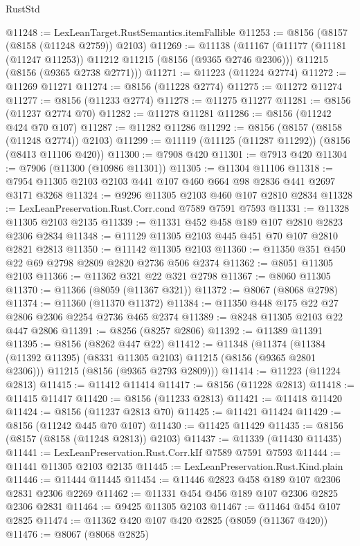 \begin{lexlean}{RustStd}
\begin{coremodule}
@11248 := LexLeanTarget.RustSemantics.itemFallible
@11253 := @8156 (@8157 (@8158 (@11248 @2759)) @2103)
@11269 := @11138
    (@11167
      (@11177 (@11181 (@11247 @11253)) @11212 @11215 (@8156 (@9365 @2746 @2306)))
      @11215
      (@8156 (@9365 @2738 @2771)))
@11271 := @11223 (@11224 @2774)
@11272 := @11269 @11271
@11274 := @8156 (@11228 @2774)
@11275 := @11272 @11274
@11277 := @8156 (@11233 @2774)
@11278 := @11275 @11277
@11281 := @8156 (@11237 @2774 @70)
@11282 := @11278 @11281
@11286 := @8156 (@11242 @424 @70 @107)
@11287 := @11282 @11286
@11292 := @8156 (@8157 (@8158 (@11248 @2774)) @2103)
@11299 := @11119 (@11125 (@11287 @11292)) (@8156 (@8413 @11106 @420))
@11300 := @7908 @420
@11301 := @7913 @420
@11304 := @7906 (@11300 (@10986 @11301))
@11305 := @11304 @11106
@11318 := @7954 @11305 @2103 @2103 @441 @107 @460 @664 @98 @2836 @441 @2697 @3171 @3268
@11324 := @9296 @11305 @2103 @460 @107 @2810 @2834
@11328 := LexLeanPreservation.Rust.Corr.cond @7589 @7591 @7593
@11331 := @11328 @11305 @2103 @2135
@11339 := @11331 @452 @458 @189 @107 @2810 @2823 @2306 @2834
@11348 := @11129 @11305 @2103 @445 @451 @70 @107 @2810 @2821 @2813
@11350 := @11142 @11305 @2103
@11360 := @11350 @351 @450 @22 @69 @2798 @2809 @2820 @2736 @506 @2374
@11362 := @8051 @11305 @2103
@11366 := @11362 @321 @22 @321 @2798
@11367 := @8060 @11305
@11370 := @11366 (@8059 (@11367 @321))
@11372 := @8067 (@8068 @2798)
@11374 := @11360 (@11370 @11372)
@11384 := @11350 @448 @175 @22 @27 @2806 @2306 @2254 @2736 @465 @2374
@11389 := @8248 @11305 @2103 @22 @447 @2806
@11391 := @8256 (@8257 @2806)
@11392 := @11389 @11391
@11395 := @8156 (@8262 @447 @22)
@11412 := @11348
    (@11374
      (@11384 (@11392 @11395) (@8331 @11305 @2103) @11215 (@8156 (@9365 @2801 @2306)))
      @11215
      (@8156 (@9365 @2793 @2809)))
@11414 := @11223 (@11224 @2813)
@11415 := @11412 @11414
@11417 := @8156 (@11228 @2813)
@11418 := @11415 @11417
@11420 := @8156 (@11233 @2813)
@11421 := @11418 @11420
@11424 := @8156 (@11237 @2813 @70)
@11425 := @11421 @11424
@11429 := @8156 (@11242 @445 @70 @107)
@11430 := @11425 @11429
@11435 := @8156 (@8157 (@8158 (@11248 @2813)) @2103)
@11437 := @11339 (@11430 @11435)
@11441 := LexLeanPreservation.Rust.Corr.kIf @7589 @7591 @7593
@11444 := @11441 @11305 @2103 @2135
@11445 := LexLeanPreservation.Rust.Kind.plain
@11446 := @11444 @11445
@11454 := @11446 @2823 @458 @189 @107 @2306 @2831 @2306 @2269
@11462 := @11331 @454 @456 @189 @107 @2306 @2825 @2306 @2831
@11464 := @9425 @11305 @2103
@11467 := @11464 @454 @107 @2825
@11474 := @11362 @420 @107 @420 @2825 (@8059 (@11367 @420))
@11476 := @8067 (@8068 @2825)

\end{coremodule}
\end{lexlean}
